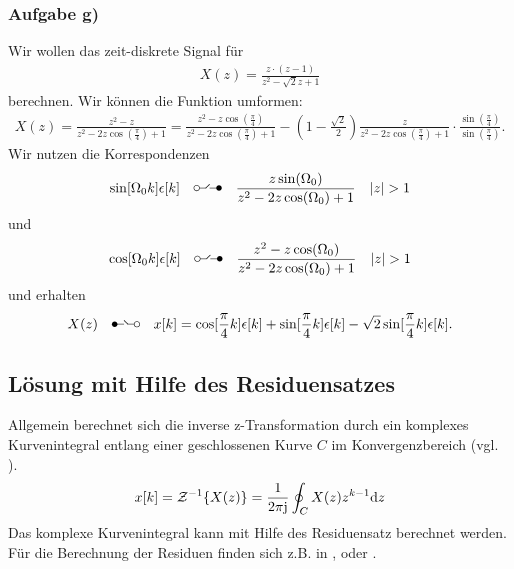 \documentclass[11pt,a4paper,DIV=12]{scrartcl}
\renewcommand{\ztransf}{\mbox{\setlength{\unitlength}{0.1em}%
                            \begin{picture}(20,10)%
                              \put(2,3){\circle{4}}%
                              \put(4,3){\line(1,0){4.75}}%
                              \multiput(8.625,3.15)(0.25,0.25){11}{%
                                \makebox(0,0){\rmfamily\tiny .}}%
                              \put(17,3){\line(-1,0){5.75}}%
                              \put(18,3){\circle*{4}}%
                            \end{picture}%
                           }
                      }
\renewcommand{\Ztransf}{\mbox{\setlength{\unitlength}{0.1em}%
                            \begin{picture}(20,10)%
                              \put(2,3){\circle*{4}}%
                              \put(3,3){\line(1,0){5.75}}%
                              \multiput(11.375,3.15)(-0.25,0.25){11}{%
                                \makebox(0,0){\rmfamily\tiny .}}%
                              \put(16,3){\line(-1,0){4.75}}%
                              \put(18,3){\circle{4}}%
                            \end{picture}%
                           }
                      }
\begin{document}
\subsubsection{Aufgabe g)}
Wir wollen das zeit-diskrete Signal für
\begin{align}
	X(z)=\frac{z\cdot(z-1)}{z^2-\sqrt{2}z+1}
\end{align}
berechnen.
Wir können die Funktion umformen:
\begin{align}
	X(z)=\frac{z^2-z}{z^2-2z\cos(\frac{\pi}{4})+1}=\frac{z^2-z\cos(\frac{\pi}{4})}{z^2-2z\cos(\frac{\pi}{4})+1}-(1-\frac{\sqrt{2}}{2})\frac{z}{z^2-2z\cos(\frac{\pi}{4})+1}\cdot\frac{\sin(\frac{\pi}{4})}{\sin(\frac{\pi}{4})}.
\end{align}
Wir nutzen die Korrespondenzen
\begin{align}
	\sin[\Omega_0k]\epsilon[k]\quad\ztransf\quad\frac{z\sin(\Omega_0)}{z^2-2z\cos(\Omega_0)+1}\quad |z| > 1
\end{align}
und
\begin{align}
	\cos[\Omega_0k]\epsilon[k]\quad\ztransf\quad\frac{z^2-z\cos(\Omega_0)}{z^2-2z\cos(\Omega_0)+1}\quad |z| > 1
\end{align}
und erhalten
\begin{align}
	X(z)\quad\Ztransf\quad x[k]=\cos[\frac{\pi}{4}k]\epsilon[k]+\sin[\frac{\pi}{4}k]\epsilon[k]-\sqrt{2}\sin[\frac{\pi}{4}k]\epsilon[k].
\end{align}
\newpage
\subsection{Lösung mit Hilfe des Residuensatzes}
Allgemein berechnet sich die inverse z-Transformation durch ein komplexes Kurvenintegral entlang einer geschlossenen Kurve $C$ im Konvergenzbereich (vgl. \cite[S. 192]{UlrichWeber2017} ).
\begin{align}
	x[k]=\mathcal{Z}^{-1}\{X(z)\}=\frac{1}{2\pi\im}\oint_C X(z)z^{k-1}\mathrm{d}z
\end{align}
Das komplexe Kurvenintegral kann mit Hilfe des Residuensatz berechnet werden.\\
Für die Berechnung der Residuen finden sich z.B. in \cite[K. 14, S. 753-754]{Bronstein2015}, \cite[S. 37-38]{UlrichWeber2017} oder \cite[S. 137-138]{Fritzsche2019}.
\end{document}
